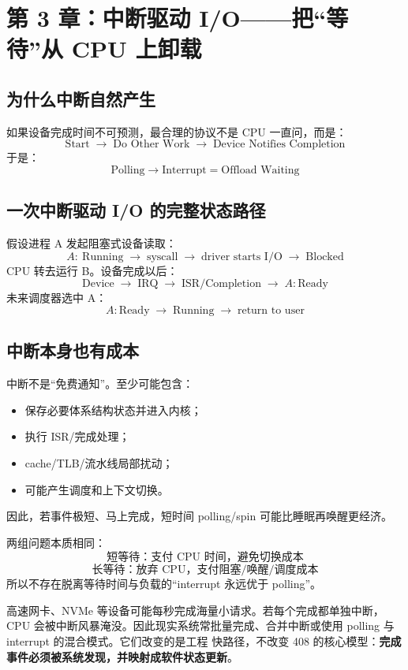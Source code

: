 \documentclass[UTF8,fontset=fandol,11pt,a4paper]{ctexart}
\newcommand{\kw}[1]{\textbf{#1}}
\newcommand{\arr}{\;\longrightarrow\;}
\begin{document}
\section{第 3 章：中断驱动 I/O——把“等待”从 CPU 上卸载}

\subsection{为什么中断自然产生}
如果设备完成时间不可预测，最合理的协议不是 CPU 一直问，而是：
\[
\boxed{\text{Start}\arr\text{Do Other Work}\arr\text{Device Notifies Completion}}
\]
于是：
\[
\boxed{\text{Polling}\to\text{Interrupt}=\text{Offload Waiting}}
\]

\subsection{一次中断驱动 I/O 的完整状态路径}
假设进程 A 发起阻塞式设备读取：
\[
A:\ \text{Running}
\arr \text{syscall}
\arr \text{driver starts I/O}
\arr \text{Blocked}
\]
CPU 转去运行 B。设备完成以后：
\[
\text{Device}\arr\text{IRQ}\arr\text{ISR/Completion}\arr A:\text{Ready}
\]
未来调度器选中 A：
\[
A:\text{Ready}\arr\text{Running}\arr\text{return to user}
\]

\subsection{中断本身也有成本}
中断不是“免费通知”。至少可能包含：
\begin{itemize}
  \item 保存必要体系结构状态并进入内核；
  \item 执行 ISR/完成处理；
  \item cache/TLB/流水线局部扰动；
  \item 可能产生调度和上下文切换。
\end{itemize}
因此，若事件极短、马上完成，短时间 polling/spin 可能比睡眠再唤醒更经济。

\begin{bridge}[与并发专题同构：Polling vs Interrupt = Spin vs Sleep]
两组问题本质相同：
\[
\boxed{\text{短等待：支付 CPU 时间，避免切换成本}}
\]
\[
\boxed{\text{长等待：放弃 CPU，支付阻塞/唤醒/调度成本}}
\]
所以不存在脱离等待时间与负载的“interrupt 永远优于 polling”。
\end{bridge}

\begin{eng}
高速网卡、NVMe 等设备可能每秒完成海量小请求。若每个完成都单独中断，CPU 会被中断风暴淹没。因此现实系统常批量完成、合并中断或使用 polling 与 interrupt 的混合模式。它们改变的是工程 快路径，不改变 408 的核心模型：\kw{完成事件必须被系统发现，并映射成软件状态更新}。
\end{eng}
\end{document}
